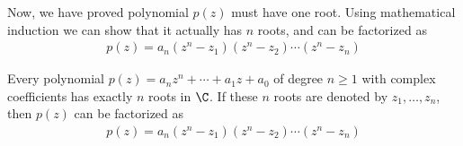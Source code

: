 \documentclass[thmcnt=section, color=cyan, 12pt]{my-elegantbook}
\begin{document}
Now, we have proved polynomial $p(z)$ must have one root. Using mathematical
induction we can show that it actually has $n$ roots, and can be factorized as
\begin{align*}
	p(z) = a_n (z^n - z_1) (z^n - z_2) \cdots (z^n - z_n)
\end{align*}

\begin{corollary}
	Every polynomial $p(z) = a_n z^n + \cdots + a_1 z + a_0$ of degree $n \geq 1$ with
	complex coefficients has exactly $n$ roots in $\C$. If these $n$ roots are
	denoted by $z_1, \ldots, z_n$, then $p(z)$ can be factorized as
	\begin{align*}
		p(z) = a_n (z^n - z_1) (z^n - z_2) \cdots (z^n - z_n)
	\end{align*}
\end{corollary}
\end{document}
